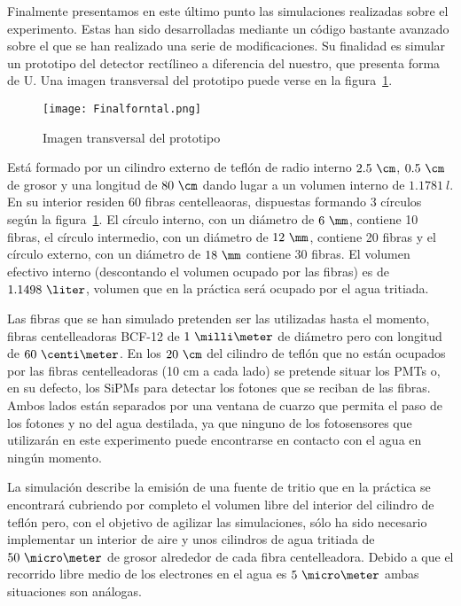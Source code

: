 Finalmente presentamos en este último punto las simulaciones realizadas sobre el experimento. Estas han sido desarrolladas mediante un código bastante avanzado sobre el que se han realizado una serie de modificaciones. Su finalidad es simular un prototipo del detector rectílineo a diferencia del nuestro, que presenta forma de U. Una imagen transversal del prototipo puede verse en la figura~\ref{imagenprototiposimulado}.

\begin{figure}[hbtp]
\centering
\texttt{[image: Finalforntal.png]}
\caption{Imagen transversal del prototipo\label{imagenprototiposimulado}}
\end{figure}


Está formado por un cilindro externo de teflón  de radio interno $2.5~\cm$, $0.5~\cm$ de grosor y una longitud de $80~\cm$ dando lugar a un volumen interno de $1.1781~l$. En su interior residen 60 fibras centelleaoras, dispuestas formando 3 círculos según la figura~\ref{imagenprototiposimulado}. El círculo interno, con un diámetro de $6~\mm$, contiene 10 fibras, el círculo intermedio, con un diámetro de $12~\mm$, contiene 20 fibras y el círculo externo, con un diámetro de $18~\mm$ contiene 30 fibras. El volumen efectivo interno (descontando el volumen ocupado por las fibras) es de $1.1498~\liter$, volumen que en la práctica será ocupado por el agua tritiada.

Las fibras que se han simulado pretenden ser las utilizadas hasta el momento, fibras centelleadoras BCF-12 de $1~\milli\meter$ de diámetro pero con longitud de $60~\centi\meter$. En los $20~\cm$  del cilindro de teflón que no están ocupados por las fibras centelleadoras (10 cm a cada lado) se pretende situar los PMTs o, en su defecto, los SiPMs para detectar los fotones que se reciban de las fibras. Ambos lados están separados por una ventana de cuarzo que permita el paso de los fotones y no del agua destilada, ya que ninguno de los fotosensores que utilizarán en este experimento puede encontrarse en contacto con el agua en ningún momento.

La simulación describe la emisión de una fuente de tritio que en la práctica se encontrará cubriendo por completo el volumen libre del interior del cilindro de teflón pero, con el objetivo de agilizar las simulaciones, sólo ha sido necesario implementar un interior de aire y unos cilindros de agua tritiada de $50~\micro\meter$ de grosor alrededor de cada fibra centelleadora. Debido a que el recorrido libre medio de los electrones en el agua es $5~\micro\meter$ ambas situaciones son análogas. 

